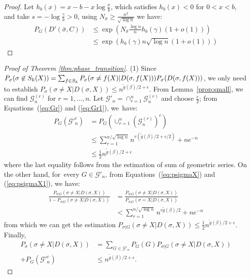 \documentclass[entropy,article,accept,moreauthors,pdftex]{Definitions/mdpi}
\newcommand{\cG}{\mathcal{G}}
\newcommand{\1}{\mathbbm{1}}
\begin{document}
\begin{paracol}{2}
\begin{proof}
	Let $h_b(x) = x - b -x\log \frac{x}{b}$, which satisfies $h_b(x) < 0$ for $0<x<b$,
	and take $s=-\log\frac{\gamma}{b} > 0$, using 
	$N_{\bar{\sigma}} \geq \frac{n^2}{\sqrt{\log n}}$ we have:
	\begin{align*}
	P_G(D'(\bar{\sigma}, C))&\leq \exp( N_{\bar{\sigma}} \frac{\log n}{n} h_b(\gamma)(1+o(1))) \\
	& \leq \exp (h_b(\gamma) n \sqrt{\log n} (1+o(1)))
	\end{align*}
\end{proof}
\begin{proof}[Proof of Theorem \ref{thm:phase_transition}]
	(1) Since $P_{\sigma}(\sigma \not \in S_k(X)) = \sum_{f\in S_k} P_{\sigma}(\sigma \neq f(X) | D(\sigma, f(X)))\linebreak P_{\sigma}(D(\sigma, f(X)))$,
	we only need to establish $P_{\sigma}(\sigma \neq X | D(\sigma, X)) \leq  n^{\tilde{g}(\beta)/2 + \epsilon}$.
	From \mbox{Lemma \ref{prop:small}}, we can find $\cG_n^{(r)}$ for $r=1,\dots, n$.
	Let $\cG'_n = \cap_{r=1}^n \cG_n^{(r)}$ and choose $\frac{\epsilon}{2}$; from Equations~(\ref{eq:Gr}) and (\ref{eq:Gr1}), we~have:
	\begin{align*}
	P_G(\cG'^c_n) &= P_G(\cup_{r=1}^n (\cG_n^{(r)})^c) \\
	&\leq \sum_{r=1}^{n/\sqrt{\log n } } n^{r(\tilde{g}(\beta)/2 + \epsilon/2)}  + n e^{-n} \\
	& \leq \frac{1}{2} n^{\tilde{g}(\beta)/2 + \epsilon}
	\end{align*}
	where the last equality follows from the estimation of sum of geometric series.
	On the other hand, for~every $G \in \cG'_n$, from Equations~(\ref{eq:psigmaX}) and (\ref{eq:psigmaX1}),
	we have:
	\begin{align*}
	\frac{P_{\sigma | G}(\sigma \neq X | D(\sigma, X))}{1-P_{\sigma | G}(\sigma \neq X | D(\sigma, X))} &= \frac{P_{\sigma | G}(\sigma \neq X | D(\sigma, X))}{P_{\sigma|G}(\sigma=X | D(\sigma, X))} \\
	&< \sum_{r=1}^{n/\sqrt{\log n }}  n^{r\tilde{g}(\beta)/2} + n e^{-n}
	\end{align*}
	from which we can get the estimation $P_{\sigma | G}(\sigma \neq X | D(\sigma, X))\leq \frac{1}{2}n^{\tilde{g}(\beta)/2 + \epsilon}$.
	Finally, 
	\begin{align*}
	P_{\sigma}(\sigma \neq X|D(\sigma, X)) &= \sum_{G\in \cG'_n} P_G(G)P_{\sigma |G}(\sigma \neq X | D(\sigma, X)) \\
	+ P_G(\cG'^c_n)
	& \leq n^{\tilde{g}(\beta)/2 + \epsilon}.
	\end{align*}
	

\end{proof}
\end{paracol}
\end{document}
